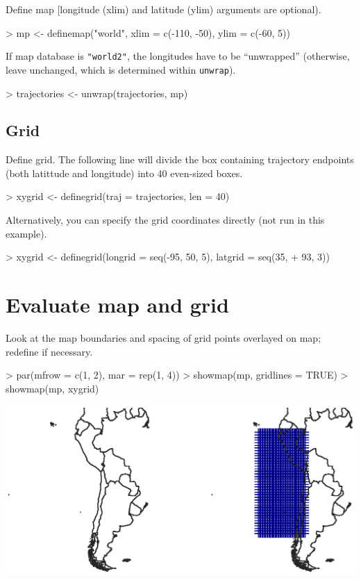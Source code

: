 \documentclass{article}
\renewenvironment{Schunk}{\vspace{\topsep}}{\vspace{\topsep}}
\begin{document}
Define map [longitude (xlim) and latitude (ylim) arguments are
optional).

\begin{Schunk}
\begin{Sinput}
> mp <- definemap("world", xlim = c(-110, -50), ylim = c(-60, 5))
\end{Sinput}
\end{Schunk}

If map database is \verb~"world2"~, the longitudes have to be ``unwrapped'' (otherwise, leave unchanged, which is determined within \verb~unwrap~). 
\begin{Schunk}
\begin{Sinput}
> trajectories <- unwrap(trajectories, mp)
\end{Sinput}
\end{Schunk}


\subsection{Grid}
Define grid. The following line will divide the box containing trajectory
endpoints (both latittude and longitude) into 40 even-sized boxes.
\begin{Schunk}
\begin{Sinput}
> xygrid <- definegrid(traj = trajectories, len = 40)
\end{Sinput}
\end{Schunk}

Alternatively, you can specify the grid coordinates directly (not run in this example).
\begin{Schunk}
\begin{Sinput}
> xygrid <- definegrid(longrid = seq(-95, 50, 5), latgrid = seq(35, 
+     93, 3))
\end{Sinput}
\end{Schunk}

\section{Evaluate map and grid}


Look at the map boundaries and spacing of grid points overlayed on
map; redefine if necessary. 

\begin{Schunk}
\begin{Sinput}
> par(mfrow = c(1, 2), mar = rep(1, 4))
> showmap(mp, gridlines = TRUE)
> showmap(mp, xygrid)
\end{Sinput}
\end{Schunk}
\includegraphics{figures/fig-012}
\end{document}
